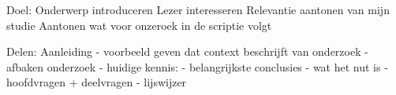 

















Doel:
Onderwerp introduceren
Lezer interesseren
Relevantie aantonen van mijn studie
Aantonen wat voor onzeroek in de scriptie volgt

Delen:
Aanleiding
	- voorbeeld geven dat context beschrijft van onderzoek
	- afbaken onderzoek
	- huidige kennis:
		- belangrijkste conclusies
	- wat het nut is
	- hoofdvragen + deelvragen
	- lijswijzer
